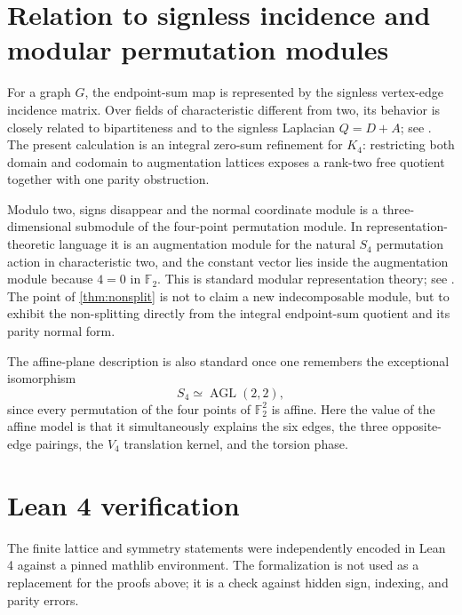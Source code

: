 \documentclass[11pt]{amsart}
\theoremstyle{definition}
\theoremstyle{remark}
\newcommand{\F}{\mathbb F}
\begin{document}
\section{Relation to signless incidence and modular permutation modules}

For a graph $G$, the endpoint-sum map is represented by the signless vertex-edge incidence matrix. Over fields of characteristic different from two, its behavior is closely related to bipartiteness and to the signless Laplacian $Q=D+A$; see \cite{CvetkovicRowlinsonSimic}. The present calculation is an integral zero-sum refinement for $K_4$: restricting both domain and codomain to augmentation lattices exposes a rank-two free quotient together with one parity obstruction.

Modulo two, signs disappear and the normal coordinate module is a three-dimensional submodule of the four-point permutation module. In representation-theoretic language it is an augmentation module for the natural $S_4$ permutation action in characteristic two, and the constant vector lies inside the augmentation module because $4=0$ in $\F_2$. This is standard modular representation theory; see \cite{Benson,JamesKerber}. The point of \cref{thm:nonsplit} is not to claim a new indecomposable module, but to exhibit the non-splitting directly from the integral endpoint-sum quotient and its parity normal form.

The affine-plane description is also standard once one remembers the exceptional isomorphism
\[
S_4\simeq \operatorname{AGL}(2,2),
\]
since every permutation of the four points of $\F_2^2$ is affine. Here the value of the affine model is that it simultaneously explains the six edges, the three opposite-edge pairings, the $V_4$ translation kernel, and the torsion phase.

\section{Lean 4 verification}

The finite lattice and symmetry statements were independently encoded in Lean 4 against a pinned mathlib environment. The formalization is not used as a replacement for the proofs above; it is a check against hidden sign, indexing, and parity errors.
\end{document}
